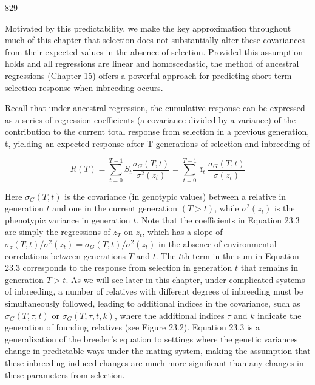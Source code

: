 \documentclass{article}
\begin{document}
829

Motivated by this predictability, we make the key approximation throughout much of this chapter that selection does not substantially alter these covariances from their expected values in the absence of selection. Provided this assumption holds and all regressions are linear and homoscedastic, the method of ancestral regressions (Chapter 15) offers a powerful approach for predicting short-term selection response when inbreeding occurs.

Recall that under ancestral regression, the cumulative response can be expressed as a series of regression coefficients (a covariance divided by a variance) of the contribution to the current total response from selection in a previous generation, t, yielding an expected response after T generations of selection and inbreeding of

\begin{equation}
R(T)=\sum_{t=0}^{T-1}S_{t}\frac{\sigma_{G}(T,t)}{\sigma^{2}(z_{t})}=\sum_{t=0}^{T-1}\bar{\imath}_{t}\frac{\sigma_{G}(T,t)}{\sigma(z_{t})}
\tag{23.3}
\label{eq:23_3}
\end{equation}

Here $\sigma_G(T, t)$ is the covariance (in genotypic values) between a relative in generation $t$ and one in the current generation $(T > t)$, while $\sigma^2(z_t)$ is the phenotypic variance in generation $t$. Note that the coefficients in Equation 23.3 are simply the regressions of $z_T$ on $z_t$, which has a slope of $\sigma_z(T, t)/\sigma^2(z_t) = \sigma_G(T, t)/\sigma^2(z_t)$ in the absence of environmental correlations between generations $T$ and $t$. The $t$th term in the sum in Equation 23.3 corresponds to the response from selection in generation $t$ that remains in generation $T > t$. As we will see later in this chapter, under complicated systems of inbreeding, a number of relatives with different degrees of inbreeding must be simultaneously followed, leading to additional indices in the covariance, such as $\sigma_G(T, \tau, t)$ or $\sigma_G(T, \tau, t, k)$, where the additional indices $\tau$ and $k$ indicate the generation of founding relatives (see Figure 23.2). Equation 23.3 is a generalization of the breeder's equation to settings where the genetic variances change in predictable ways under the mating system, making the assumption that these inbreeding-induced changes are much more significant than any changes in these parameters from selection.
\end{document}
